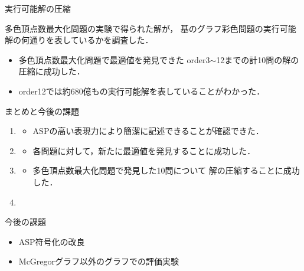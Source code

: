 \documentclass[dvipdfmx,11pt]{beamer}
\begin{document}
\begin{frame}{実行可能解の圧縮}

 \begin{block}{}
  多色頂点数最大化問題の実験で得られた解が，
  基のグラフ彩色問題の実行可能解の何通りを表しているかを調査した．
 \end{block}
 
 \begin{center}
  
 \end{center}

 \begin{itemize}
  \item 多色頂点数最大化問題で最適値を発見できた
        order3$\sim$12までの計10問の解の圧縮に成功した．
  \item order12では約680億もの実行可能解を表していることがわかった．
 \end{itemize}

\end{frame}


\begin{frame}{まとめと今後の課題}

 \begin{enumerate}
  \item {}
        \begin{itemize}
         \item ASPの高い表現力により簡潔に記述できることが確認できた．
        \end{itemize}
  \item {}
        \begin{itemize}
         \item 各問題に対して，新たに最適値を発見することに成功した．
        \end{itemize}
  \item {}
        \begin{itemize}
         \item 多色頂点数最大化問題で発見した10問について
               解の圧縮することに成功した．
        \end{itemize}
  \item {}
 \end{enumerate}

 \begin{block}{今後の課題}
  \begin{itemize}
   \item ASP符号化の改良
   \item McGregorグラフ以外のグラフでの評価実験
  \end{itemize}
 \end{block}
 
\end{frame}
\end{document}
